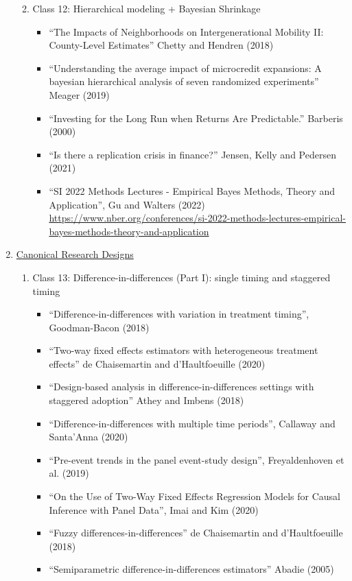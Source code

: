 \documentclass[11pt, a4paper]{article}
\begin{document}
\begin{enumerate}
\begin{enumerate}
\begin{itemize}
    \end{itemize}
  \item Class 12: Hierarchical modeling + Bayesian Shrinkage
    \begin{itemize}
    \item ``The Impacts of Neighborhoods on Intergenerational Mobility II: County-Level Estimates'' Chetty and Hendren (2018)
    \item ``Understanding the average impact of microcredit expansions: A bayesian hierarchical analysis of seven randomized experiments'' Meager (2019)
    \item ``Investing for the Long Run when Returns Are Predictable.'' Barberis (2000)
    \item ``Is there a replication crisis in finance?'' Jensen, Kelly and Pedersen (2021)
      \item ``SI 2022 Methods Lectures - Empirical Bayes Methods, Theory and Application'', Gu and Walters (2022) \url{https://www.nber.org/conferences/si-2022-methods-lectures-empirical-bayes-methods-theory-and-application}
    \end{itemize}
  \end{enumerate}
\item  \underline{Canonical Research Designs}
  \begin{enumerate}
  \item Class 13: Difference-in-differences (Part I): single timing and staggered timing
    \begin{itemize}
    \item ``Difference-in-differences with variation in treatment timing'', Goodman-Bacon (2018)
    \item ``Two-way fixed effects estimators with heterogeneous treatment effects'' de Chaisemartin and d'Haultfoeuille (2020)
    \item ``Design-based analysis in difference-in-differences settings with staggered adoption'' Athey and Imbens (2018)
    \item ``Difference-in-differences with multiple time periods'', Callaway and Santa'Anna (2020)
    \item ``Pre-event trends in the panel event-study design'', Freyaldenhoven et al. (2019)
    \item ``On the Use of Two-Way Fixed Effects Regression Models for Causal Inference with Panel Data'', Imai and Kim (2020)
    \item ``Fuzzy differences-in-differences'' de Chaisemartin and d'Haultfoeuille (2018)
    \item ``Semiparametric difference-in-differences estimators'' Abadie (2005)

\end{itemize}
\end{enumerate}
\end{enumerate}
\end{document}

